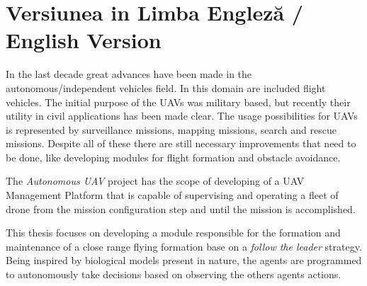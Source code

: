 
\section{Versiunea in Limba Engleză / English Version}

In the last decade great advances have been made in the autonomous/independent
vehicles field. In this domain are included flight vehicles. The initial 
purpose of the UAVs was military based, but recently their utility in civil applications
has been made clear. The usage possibilities for UAVs is represented by surveillance
missions, mapping missions, search and rescue missions. Despite all of these
there are still necessary improvements that need to be done, like developing
modules for flight formation and obstacle avoidance.

The \textit{Autonomous UAV} project has the scope of developing of 
a {UAV Management Platform} that is capable of supervising and operating a fleet
of drone from the mission configuration step and until the mission is accomplished.

This thesis focuses on developing a module responsible for the formation and
maintenance of a close range flying formation base on a \textit{follow the leader}
strategy. Being inspired by biological models present in nature,  the agents are 
programmed to autonomously take decisions based on observing the others agents 
actions.